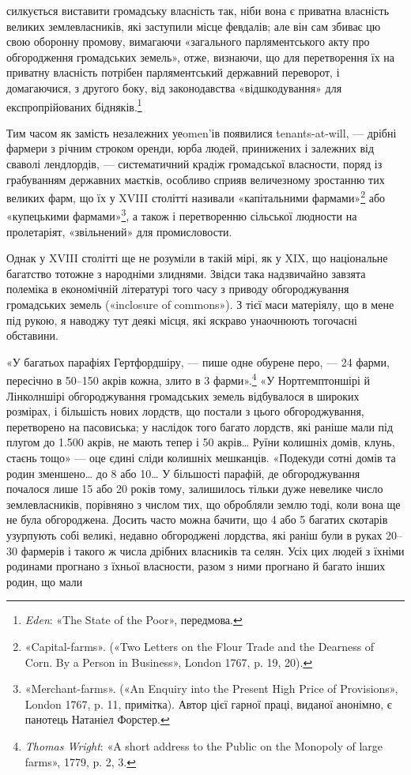 \parcont{}  %
силкується виставити громадську власність так, ніби вона є
приватна власність великих землевласників, які заступили місце
февдалів; але він сам збиває цю свою оборонну промову, вимагаючи
«загального парляментського акту про обгородження громадських
земель», отже, визнаючи, що для перетворення їх на
приватну власність потрібен парляментський державний переворот,
і домагаючися, з другого боку, від законодавства «відшкодування»
для експропрійованих бідняків.\footnote{
\emph{Eden}: «The State of the Poor», передмова.
}

Тим часом як замість незалежних уеomen’ів появилися tenants-at-will,
— дрібні фармери з річним строком оренди, юрба
людей, принижених і залежних від сваволі лендлордів, — систематичний
крадіж громадської власности, поряд із грабуванням
державних маєтків, особливо сприяв величезному зростанню
тих великих фарм, що їх у XVIII столітті називали «капітальними
фармами»\footnote{
«Capital-farms». («Two Letters on the Flour Trade and the Dearness
of Corn. By a Person in Business», London 1767, p. 19, 20).
} або «купецькими фармами»\footnote{
«Merchant-farms». («An Enquiry into the Present High Price
of Provisions», London 1767, p. 11, примітка). Автор цієї гарної праці,
виданої анонімно, є панотець Натаніел Форстер.
}, а також і перетворенню
сільської людности на пролетаріят, «звільнений» для
промисловости.

Однак у XVIII столітті ще не розуміли в такій мірі, як у
XIX, що національне багатство тотожне з народніми злиднями.
Звідси така надзвичайно завзята полеміка в економічній літературі
того часу з приводу обгороджування громадських земель
(«inclosure of commons»). З тієї маси матеріялу, що в мене під
рукою, я наводжу тут деякі місця, які яскраво унаочнюють тогочасні
обставини.

«У багатьох парафіях Гертфордшіру, — пише одне обурене
перо, — 24 фарми, пересічно в 50--150 акрів кожна, злито в
3 фарми».\footnote{
\emph{Thomas Wright}: «A short address to the Public on the Monopoly
of large farms», 1779, p. 2, 3.
} «У Нортгемптоншірі й Лінколншірі обгороджування
громадських земель відбувалося в широких розмірах, і
більшість нових лордств, що постали з цього обгороджування,
перетворено на пасовиська; у наслідок того багато лордств, які
раніше мали під плугом до 1.500 акрів, не мають тепер і 50 акрів\dots{}
Руїни колишніх домів, клунь, стаєнь тощо» — оце єдині
сліди колишніх мешканців. «Подекуди сотні домів та родин
зменшено\dots{} до 8 або 10\dots{} У більшості парафій, де обгороджування
почалося лише 15 або 20 років тому, залишилось тільки дуже
невелике число землевласників, порівняно з числом тих, що
обробляли землю тоді, коли вона ще не була обгороджена. Досить
часто можна бачити, що 4 або 5 багатих скотарів узурпують
собі великі, недавно обгороджені лордства, які раніш були в
руках 20--30 фармерів і такого ж числа дрібних власників та
селян. Усіх цих людей з їхніми родинами прогнано з їхньої
власности, разом з ними прогнано й багато інших родин, що мали
\parbreak{}  %
